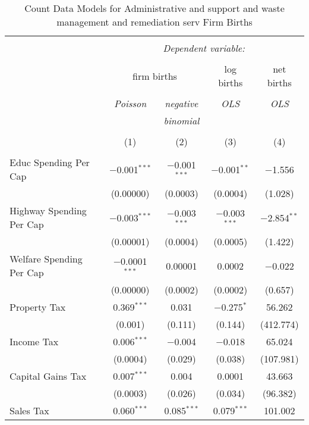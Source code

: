 
\begin{table}[!htbp] \centering 
  \caption{Count Data Models for Administrative and support and waste management and remediation serv Firm Births} 
  \label{} 
\begin{tabular}{@{\extracolsep{5pt}}lcccc} 
\\[-1.8ex]\hline 
\hline \\[-1.8ex] 
 & \multicolumn{4}{c}{\textit{Dependent variable:}} \\ 
\cline{2-5} 
\\[-1.8ex] & \multicolumn{2}{c}{firm births} & log births & net births \\ 
\\[-1.8ex] & \textit{Poisson} & \textit{negative} & \textit{OLS} & \textit{OLS} \\ 
 & \textit{} & \textit{binomial} & \textit{} & \textit{} \\ 
\\[-1.8ex] & (1) & (2) & (3) & (4)\\ 
\hline \\[-1.8ex] 
 Educ Spending Per Cap & $-$0.001$^{***}$ & $-$0.001$^{***}$ & $-$0.001$^{**}$ & $-$1.556 \\ 
  & (0.00000) & (0.0003) & (0.0004) & (1.028) \\ 
  Highway Spending Per Cap  & $-$0.003$^{***}$ & $-$0.003$^{***}$ & $-$0.003$^{***}$ & $-$2.854$^{**}$ \\ 
  & (0.00001) & (0.0004) & (0.0005) & (1.422) \\ 
  Welfare Spending Per Cap  & $-$0.0001$^{***}$ & 0.00001 & 0.0002 & $-$0.022 \\ 
  & (0.00000) & (0.0002) & (0.0002) & (0.657) \\ 
  Property Tax & 0.369$^{***}$ & 0.031 & $-$0.275$^{*}$ & 56.262 \\ 
  & (0.001) & (0.111) & (0.144) & (412.774) \\ 
  Income Tax & 0.006$^{***}$ & $-$0.004 & $-$0.018 & 65.024 \\ 
  & (0.0004) & (0.029) & (0.038) & (107.981) \\ 
  Capital Gains Tax & 0.007$^{***}$ & 0.004 & 0.0001 & 43.663 \\ 
  & (0.0003) & (0.026) & (0.034) & (96.382) \\ 
  Sales Tax & 0.060$^{***}$ & 0.085$^{***}$ & 0.079$^{***}$ & 101.002 \\ 

\end{tabular}
\end{table}
